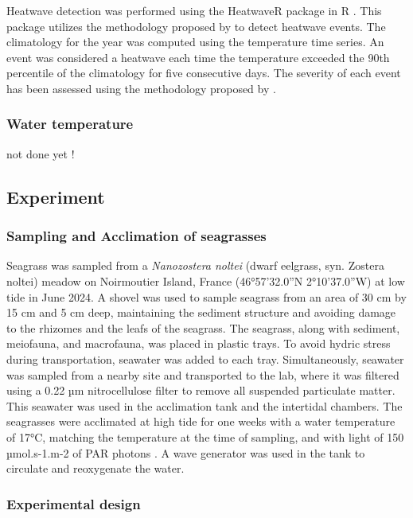 \documentclass[
  number]{elsarticle}
\begin{document}
Heatwave detection was performed using the HeatwaveR package in R
\citep{heatwaveR}. This package utilizes the methodology proposed by
\citep{hobday2016hierarchical} to detect heatwave events. The
climatology for the year was computed using the temperature time series.
An event was considered a heatwave each time the temperature exceeded
the 90th percentile of the climatology for five consecutive days. The
severity of each event has been assessed using the methodology proposed
by \citep{hobday2018categorizing}.

\subsubsection{Water temperature}\label{water-temperature}

not done yet !

\subsection{Experiment}\label{experiment}

\subsubsection{Sampling and Acclimation of
seagrasses}\label{sampling-and-acclimation-of-seagrasses}

Seagrass was sampled from a \emph{Nanozostera noltei} (dwarf eelgrass,
syn. Zostera noltei) meadow on Noirmoutier Island, France (46°57'32.0''N
2°10'37.0''W) at low tide in June 2024. A shovel was used to sample
seagrass from an area of 30 cm by 15 cm and 5 cm deep, maintaining the
sediment structure and avoiding damage to the rhizomes and the leafs of
the seagrass. The seagrass, along with sediment, meiofauna, and
macrofauna, was placed in plastic trays. To avoid hydric stress during
transportation, seawater was added to each tray. Simultaneously,
seawater was sampled from a nearby site and transported to the lab,
where it was filtered using a 0.22 µm nitrocellulose filter to remove
all suspended particulate matter. This seawater was used in the
acclimation tank and the intertidal chambers. The seagrasses were
acclimated at high tide for one weeks with a water temperature of 17°C,
matching the temperature at the time of sampling, and with light of 150
µmol.s-1.m-2 of PAR photons \citep{akbar2020mangrove}. A wave generator
was used in the tank to circulate and reoxygenate the water.

\subsubsection{Experimental design}\label{experimental-design}
\end{document}
